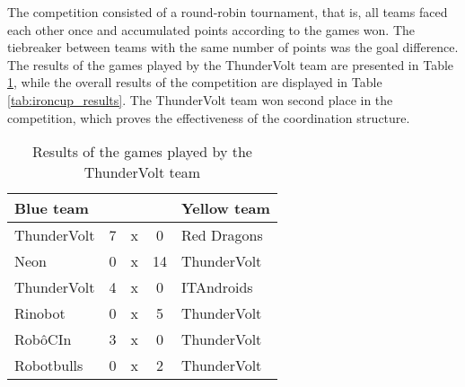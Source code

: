 The competition consisted of a round-robin tournament, that is, all teams faced each other once and accumulated points according to the games won. The tiebreaker between teams with the same number of points was the goal difference. The results of the games played by the ThunderVolt team are presented in Table \ref{tab:ironcup_games}, while the overall results of the competition are displayed in Table  \ref{tab:ironcup_results}. The ThunderVolt team won second place in the competition, which proves the effectiveness of the coordination structure.

\begin{table}[h]
    \centering
    \begin{tabular}{l c c c l}
        \toprule
        Blue team   &   &   &    & Yellow team \\
        \midrule
        ThunderVolt	& 7	& x	&  0 & Red Dragons \\
        Neon        & 0 & x & 14 & ThunderVolt \\
        ThunderVolt & 4 & x &  0 & ITAndroids  \\
        Rinobot     & 0 & x &  5 & ThunderVolt \\
        RobôCIn	    & 3 & x &  0 & ThunderVolt \\
        Robotbulls  & 0 & x &  2 & ThunderVolt \\
        \bottomrule
    \end{tabular}
    \caption{Results of the games played by the ThunderVolt team \cite{ResultsIRONCup2023}}
    \label{tab:ironcup_games}
\end{table}

